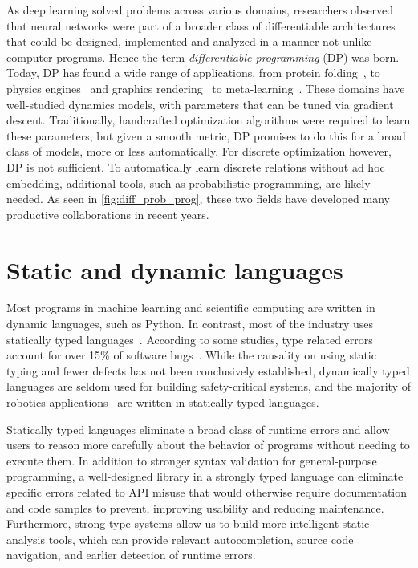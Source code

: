 \documentclass[12pt,initial,twoside,maitrise]{dms}
\numberwithin{equation}{section}
\numberwithin{table}{chapter}
\numberwithin{figure}{chapter}
\begin{document}
As deep learning solved problems across various domains, researchers observed that neural networks were part of a broader class of differentiable architectures that could be designed, implemented and analyzed in a manner not unlike computer programs. Hence the term \textit{differentiable programming} (DP) was born. Today, DP has found a wide range of applications, from protein folding~\citep{alquraishi2018end}, to physics engines~\citep{de2018end, degrave2016differentiable} and graphics rendering~\citep{loper2014opendr} to meta-learning~\citep{liu2018darts}. These domains have well-studied dynamics models, with parameters that can be tuned via gradient descent. Traditionally, handcrafted optimization algorithms were required to learn these parameters, but given a smooth metric, DP promises to do this for a broad class of models, more or less automatically. For discrete optimization however, DP is not sufficient. To automatically learn discrete relations without ad hoc embedding, additional tools, such as probabilistic programming, are likely needed. As seen in \autoref{fig:diff_prob_prog}, these two fields have developed many productive collaborations in recent years.

\section{Static and dynamic languages}

Most programs in machine learning and scientific computing are written in dynamic languages, such as Python. In contrast, most of the industry uses statically typed languages~\citep{github}. According to some studies, type related errors account for over 15\% of software bugs~\citep{gao2017type}. While the causality on using static typing and fewer defects has not been conclusively established, dynamically typed languages are seldom used for building safety-critical systems, and the majority of robotics applications~\citep{Areserio54:online} are written in statically typed languages.

Statically typed languages eliminate a broad class of runtime errors and allow users to reason more carefully about the behavior of programs without needing to execute them. In addition to stronger syntax validation for general-purpose programming, a well-designed library in a strongly typed language can eliminate specific errors related to API misuse that would otherwise require documentation and code samples to prevent, improving usability and reducing maintenance. Furthermore, strong type systems allow us to build more intelligent static analysis tools, which can provide relevant autocompletion, source code navigation, and earlier detection of runtime errors.
\end{document}
